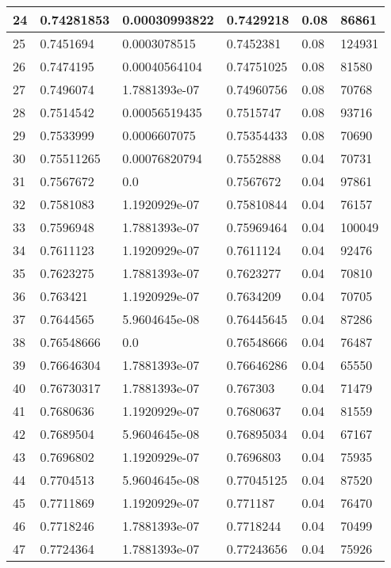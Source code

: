 \begin{longtable}{|l|l|l|l|l|l|}
24 & 0.74281853 & 0.00030993822 & 0.7429218 & 0.08 & 86861 \\ \hline 
25 & 0.7451694 & 0.0003078515 & 0.7452381 & 0.08 & 124931 \\ \hline 
26 & 0.7474195 & 0.00040564104 & 0.74751025 & 0.08 & 81580 \\ \hline 
27 & 0.7496074 & 1.7881393e-07 & 0.74960756 & 0.08 & 70768 \\ \hline 
28 & 0.7514542 & 0.00056519435 & 0.7515747 & 0.08 & 93716 \\ \hline 
29 & 0.7533999 & 0.0006607075 & 0.75354433 & 0.08 & 70690 \\ \hline 
30 & 0.75511265 & 0.00076820794 & 0.7552888 & 0.04 & 70731 \\ \hline 
31 & 0.7567672 & 0.0 & 0.7567672 & 0.04 & 97861 \\ \hline 
32 & 0.7581083 & 1.1920929e-07 & 0.75810844 & 0.04 & 76157 \\ \hline 
33 & 0.7596948 & 1.7881393e-07 & 0.75969464 & 0.04 & 100049 \\ \hline 
34 & 0.7611123 & 1.1920929e-07 & 0.7611124 & 0.04 & 92476 \\ \hline 
35 & 0.7623275 & 1.7881393e-07 & 0.7623277 & 0.04 & 70810 \\ \hline 
36 & 0.763421 & 1.1920929e-07 & 0.7634209 & 0.04 & 70705 \\ \hline 
37 & 0.7644565 & 5.9604645e-08 & 0.76445645 & 0.04 & 87286 \\ \hline 
38 & 0.76548666 & 0.0 & 0.76548666 & 0.04 & 76487 \\ \hline 
39 & 0.76646304 & 1.7881393e-07 & 0.76646286 & 0.04 & 65550 \\ \hline 
40 & 0.76730317 & 1.7881393e-07 & 0.767303 & 0.04 & 71479 \\ \hline 
41 & 0.7680636 & 1.1920929e-07 & 0.7680637 & 0.04 & 81559 \\ \hline 
42 & 0.7689504 & 5.9604645e-08 & 0.76895034 & 0.04 & 67167 \\ \hline 
43 & 0.7696802 & 1.1920929e-07 & 0.7696803 & 0.04 & 75935 \\ \hline 
44 & 0.7704513 & 5.9604645e-08 & 0.77045125 & 0.04 & 87520 \\ \hline 
45 & 0.7711869 & 1.1920929e-07 & 0.771187 & 0.04 & 76470 \\ \hline 
46 & 0.7718246 & 1.7881393e-07 & 0.7718244 & 0.04 & 70499 \\ \hline 
47 & 0.7724364 & 1.7881393e-07 & 0.77243656 & 0.04 & 75926 \\ \hline 

\end{longtable}
